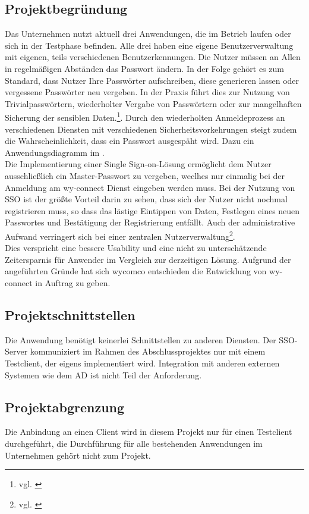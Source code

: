 \subsection{Projektbegründung} 
\label{sec:Projektbegruendung}
Das Unternehmen nutzt aktuell drei Anwendungen, die im Betrieb laufen oder sich in der Testphase befinden. Alle drei haben eine eigene Benutzerverwaltung mit eigenen, teils verschiedenen Benutzerkennungen. Die Nutzer müssen an Allen in regelmäßigen Abständen das Passwort ändern. 
In der Folge gehört es zum Standard, dass Nutzer Ihre Passwörter aufschreiben, diese generieren lassen oder vergessene Passwörter neu vergeben. In der Praxis führt dies zur Nutzung von Trivialpasswörtern, wiederholter Vergabe von Passwörtern oder zur mangelhaften Sicherung der sensiblen Daten.\footnote{vgl. \cite{datenschutzbeauftragter}}. 
Durch den wiederholten Anmeldeprozess an verschiedenen Diensten mit verschiedenen Sicherheitsvorkehrungen steigt zudem die Wahrscheinlichkeit, dass ein Passwort ausgespäht wird. 
Dazu ein Anwendungsdiagramm im . \\
Die Implementierung einer Single Sign-on-Lösung ermöglicht dem Nutzer ausschließlich ein Master-Passwort zu vergeben, weclhes nur einmalig bei der Anmeldung am wy-connect Dienst eingeben werden muss. Bei der Nutzung von \ac{SSO} ist der größte Vorteil darin zu sehen, dass sich der Nutzer nicht nochmal registrieren muss, so dass das lästige Eintippen von Daten, Festlegen eines neuen Passwortes und Bestätigung der Registrierung entfällt. Auch der administrative Aufwand verringert sich bei einer zentralen Nutzerverwaltung\footnote{vgl. \cite{univention}}.\\
Dies verspricht eine bessere Usability und eine nicht zu unterschätzende Zeitersparnis für Anwender im Vergleich zur derzeitigen Lösung. 
Aufgrund der angeführten Gründe hat sich wycomco entschieden die Entwicklung von wy-connect in Auftrag zu geben.
\subsection{Projektschnittstellen} 
\label{sec:Projektschnittstellen}
Die Anwendung benötigt keinerlei Schnittstellen zu anderen Diensten. Der \ac{SSO}-Server kommuniziert im Rahmen des Abschlussprojektes nur mit einem Testclient, der eigens implementiert wird.
Integration mit anderen externen Systemen wie dem \ac{AD} ist nicht Teil der Anforderung.
\subsection{Projektabgrenzung} 
\label{sec:Projektabgrenzung}
Die Anbindung an einen Client wird in diesem Projekt nur für einen Testclient durchgeführt, die Durchführung für alle bestehenden Anwendungen im Unternehmen gehört nicht zum Projekt.